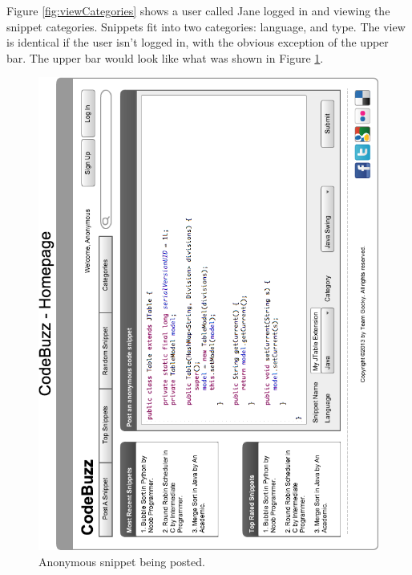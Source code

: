 \documentclass[11pt,a4paper]{article}
\begin{document}
Figure \ref{fig:viewCategories} shows a user called Jane logged in and viewing
the snippet categories. Snippets fit into two categories: language, and type.
The view is identical if the user isn't logged in, with the obvious exception
of the upper bar. The upper bar would look like what was shown in Figure
\ref{fig:anonsnippet}.

\begin{figure}
\includegraphics[width=\textwidth]{../imgs/homepageWireFrameGRHorz.png}
\caption{Anonymous snippet being posted.}
\label{fig:anonsnippet}
\end{figure}
\end{document}
